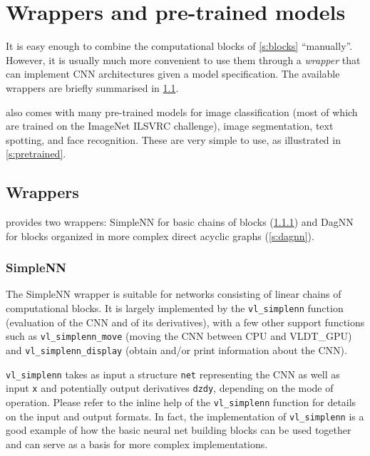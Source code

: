 \chapter{Wrappers and pre-trained models}\label{s:wrappers}

It is easy enough to combine the computational blocks of \cref{s:blocks} ``manually''. However, it is usually much more convenient to use them through a \emph{wrapper} that can implement CNN architectures given a model specification. The available wrappers are briefly summarised in \cref{s:wrappers-overview}.

\matconvnet also comes with many pre-trained models for image classification (most of which are trained on the ImageNet ILSVRC challenge), image segmentation, text spotting, and face recognition. These are very simple to use, as illustrated in \cref{s:pretrained}.

\section{Wrappers}\label{s:wrappers-overview}

\matconvnet provides two wrappers: SimpleNN for basic chains of blocks (\cref{s:simplenn}) and DagNN for blocks organized in more complex direct acyclic graphs (\cref{s:dagnn}).

\subsection{SimpleNN}\label{s:simplenn}

The SimpleNN wrapper is suitable for networks consisting of linear chains of computational blocks.  It is largely implemented by the \verb!vl_simplenn! function (evaluation of the CNN and of its derivatives), with a few other support functions such as \verb!vl_simplenn_move! (moving the CNN between CPU and VLDT_GPU) and \verb!vl_simplenn_display! (obtain and/or print information about the CNN).

\verb!vl_simplenn! takes as input a structure \verb!net! representing the CNN as well as input \verb!x! and potentially output derivatives \verb!dzdy!, depending on the mode of operation. Please refer to the inline help of the \verb!vl_simplenn! function for details on the input and output formats. In fact, the implementation of \verb!vl_simplenn! is a good example of how the basic neural net building blocks can be used together and can serve as a basis for more complex implementations.

